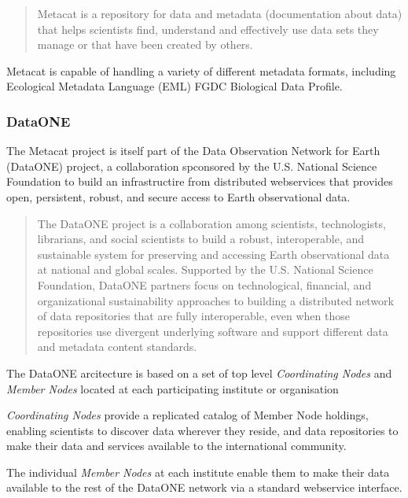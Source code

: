 \documentclass{article}
\begin{document}
\begin{quote}
Metacat is a repository for data and metadata (documentation about data) that
helps scientists find, understand and effectively use data sets they manage or
that have been created by others.
\end{quote}

Metacat is capable of handling a variety of different metadata formats,
including Ecological Metadata Language (EML)
FGDC Biological Data Profile.

\subsubsection{DataONE}

The Metacat project is itself part of the Data Observation Network for Earth (DataONE)
project, a collaboration spconsored by the U.S. National Science Foundation to build
an infrastructire from distributed webservices that provides open, persistent, robust,
and secure access to Earth observational data.
 
\begin{quote}
The DataONE project is a collaboration among scientists, technologists,
librarians, and social scientists to build a robust, interoperable, and
sustainable system for preserving and accessing Earth observational data at
national and global scales. Supported by the U.S. National Science Foundation,
DataONE partners focus on technological, financial, and organizational
sustainability approaches to building a distributed network of data repositories
that are fully interoperable, even when those repositories use divergent
underlying software and support different data and metadata content standards.
\end{quote}

The DataONE arcitecture is based on a set of top level 
\textit{Coordinating Nodes}
and
\textit{Member Nodes}
located at each participating institute or organisation

\textit{Coordinating Nodes}
provide a replicated catalog of Member Node holdings, enabling
scientists to discover data wherever they reside,
and data repositories to make their data and services available
to the international community.

The individual \textit{Member Nodes}
at each institute enable them to make their data available
to the rest of the DataONE network
via a standard webservice interface.
\end{document}
